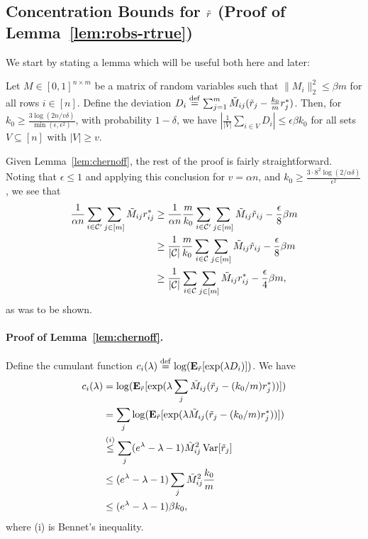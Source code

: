 \subsection{Concentration Bounds for $\tilde{r}$ (Proof of Lemma~\ref{lem:robs-rtrue})}
\label{sec:concentration-proof}
We start by stating a lemma which will be useful both here and later:
\begin{lemma}
\label{lem:chernoff}
Let $M \in [0,1]^{n \times m}$ be a matrix of random variables 
such that $\|M_i\|_2^2 \leq \beta m$ for all rows $i \in [n]$. 
Define the deviation $D_i \stackrel{\rm def}{=} \sum_{j=1}^m \tilde{M}_{ij}(\tilde{r}_j - \frac{k_0}{m}r^*_j)$. 
Then, for $k_0 \geq \frac{3\log(2n/v\delta)}{\min(\epsilon,\epsilon^2)}$, 
with probability $1-\delta$, we have 
$\left|\frac{1}{|V|} \sum_{i \in V} D_{i}\right| \leq \epsilon \beta k_0$ for all 
sets $V \subseteq [n]$ with $|V| \geq v$.
\end{lemma}
Given Lemma~\ref{lem:chernoff}, the rest of the proof is fairly straightforward.
Noting that $\epsilon \leq 1$ and applying this conclusion for 
$v = \alpha n$, and $k_0 \geq \frac{3 \cdot 8^2\log(2/\alpha\delta)}{\epsilon^2}$, 
we see that
\begin{align}
\frac{1}{\alpha n} \sum_{i \in \mathcal{C}'} \sum_{j \in [m]} \tilde{M}_{ij} r^*_{ij} &\geq \frac{1}{\alpha n}\frac{m}{k_0} \sum_{i \in \mathcal{C}'} \sum_{j \in [m]} \tilde{M}_{ij} \tilde{r}_{ij} - \frac{\epsilon}{8} \beta m \\
 &\geq \frac{1}{|\mathcal{C}|}\frac{m}{k_0} \sum_{i \in \mathcal{C}} \sum_{j \in [m]} \tilde{M}_{ij} \tilde{r}_{ij} - \frac{\epsilon}{8} \beta m \\
 &\geq \frac{1}{|\mathcal{C}|}\sum_{i \in \mathcal{C}} \sum_{j \in [m]} \tilde{M}_{ij} r^*_{ij} - \frac{\epsilon}{4} \beta m,
\end{align}
as was to be shown.

\paragraph{Proof of Lemma~\ref{lem:chernoff}.}
Define the cumulant function $c_i(\lambda) \stackrel{\rm def}{=} \log(\mathbf{E}_{\tilde{r}}[\exp(\lambda D_i)])$. We have
\begin{align}
c_i(\lambda) &=\log(\mathbf{E}_{\tilde{r}}[\exp(\lambda \sum_j \tilde{M}_{ij}(\tilde{r}_j - (k_0/m)r^*_j))]) \\
 &=\sum_j \log(\mathbf{E}_{\tilde{r}}[\exp(\lambda \tilde{M}_{ij}(\tilde{r}_j - (k_0/m)r^*_j))]) \\
 &\stackrel{(i)}{\leq} \sum_j (e^{\lambda} - \lambda - 1)\tilde{M}_{ij}^2\operatorname{Var}[\tilde{r}_j] \\
 &\leq (e^{\lambda} - \lambda - 1) \sum_j \tilde{M}_{ij}^2 \frac{k_0}{m} \\
 &\leq (e^{\lambda}-\lambda-1)\beta k_0,
\end{align}
where (i) is Bennet's inequality.

